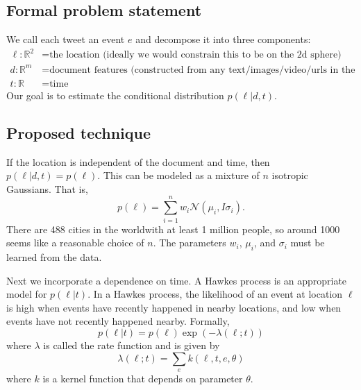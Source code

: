 \documentclass{article}
\newcommand{\R}{\mathbb{R}}
\newcommand{\prob}[1]{p\!\left({#1}\right)}
\newcommand{\cprob}[2]{\prob{{#1} | {#2}}}
\newcommand{\normal}[2]{\mathcal{N}({#1},{#2})}
\newcommand{\eye}{I}
\begin{document}

\subsection {Formal problem statement}

We call each tweet an event $e$ and decompose it into three components: 
\begin{align*}
    \ell : \R^2 &= \text{the location (ideally we would constrain this to be on the 2d sphere)} \\
    d    : \R^m &= \text{document features (constructed from any text/images/video/urls in the tweet)} \\
    t    : \R~ &= \text{time}
\end{align*}
Our goal is to estimate the conditional distribution $\cprob{\ell}{d,t}$.


\subsection {Proposed technique}

If the location is independent of the document and time, then $\cprob{\ell}{d,t} = \prob{\ell}$.
This can be modeled as a mixture of $n$ isotropic Gaussians.
That is,
\begin{equation}
    \prob{\ell} = \sum_{i=1}^n w_i\normal{\mu_i}{\eye\sigma_i}
    .
\end{equation}
There are 488 cities in the worldwith at least 1 million people, 
so around 1000 seems like a reasonable choice of $n$.
The parameters $w_i$, $\mu_i$, and $\sigma_i$ must be learned from the data.

Next we incorporate a dependence on time.
A Hawkes process is an appropriate model for $\cprob{\ell}{t}$.
In a Hawkes process,
the likelihood of an event at location $\ell$ is high when events have recently happened in nearby locations,
and low when events have not recently happened nearby.
Formally,
\begin{equation}
    \cprob{\ell}{t} 
    =
    \prob{\ell}\exp(-\lambda(\ell;t))
\end{equation}
where $\lambda$ is called the rate function and is given by
\begin{equation}
    \label{eq:kernel}
    \lambda(\ell;t) = \sum_{e} k(\ell,t,e,\theta)
\end{equation}
where $k$ is a kernel function that depends on parameter $\theta$.
\end{document}
